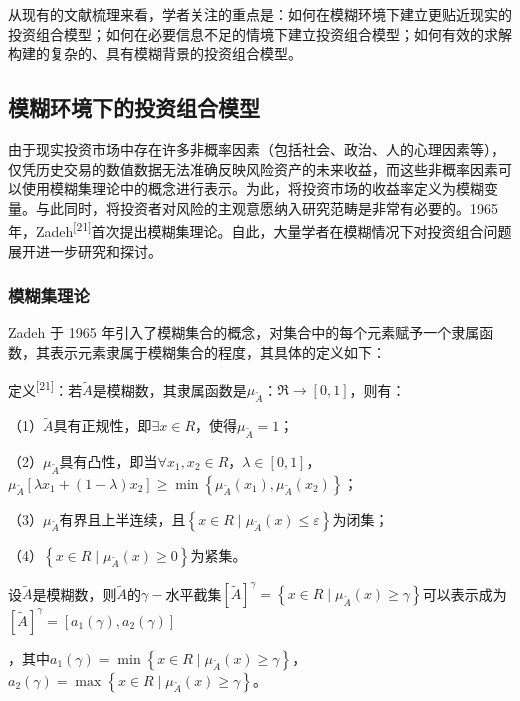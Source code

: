 \documentclass[]{article}
\begin{document}
从现有的文献梳理来看，学者关注的重点是：如何在模糊环境下建立更贴近现实的投资组合模型；如何在必要信息不足的情境下建立投资组合模型；如何有效的求解构建的复杂的、具有模糊背景的投资组合模型。

\hypertarget{header-n12}{%
\subsection{模糊环境下的投资组合模型}\label{header-n12}}

由于现实投资市场中存在许多非概率因素（包括社会、政治、人的心理因素等），仅凭历史交易的数值数据无法准确反映风险资产的未来收益，而这些非概率因素可以使用模糊集理论中的概念进行表示。为此，将投资市场的收益率定义为模糊变量。与此同时，将投资者对风险的主观意愿纳入研究范畴是非常有必要的。1965
年，Zadeh\textsuperscript{{[}21{]}}首次提出模糊集理论。自此，大量学者在模糊情况下对投资组合问题展开进一步研究和探讨。

\hypertarget{header-n14}{%
\subsubsection{模糊集理论}\label{header-n14}}

Zadeh 于 1965
年引入了模糊集合的概念，对集合中的每个元素赋予一个隶属函数，其表示元素隶属于模糊集合的程度，其具体的定义如下：

定义\textsuperscript{{[}21{]}}：若\(\widetilde{A}\)是模糊数，其隶属函数是\(\mu_{\widetilde{A}}\)：\(\Re \rightarrow[0,1]\)，则有：

（1）\(\widetilde{A}\)具有正规性，即\(\exists x \in R\)，使得\(\mu_{\widetilde{A}}=1\)；

（2）\(\mu_{\widetilde{A}}\)具有凸性，即当\(\forall x_{1}, x_{2} \in R\)，\(\lambda \in [0,1]\)，\(\mu_{\tilde{A}}\left[\lambda x_{1}+(1-\lambda) x_{2}\right] \geq \min \left\{\mu_{\tilde{A}}\left(x_{1}\right), \mu_{\widetilde{A}}\left(x_{2}\right)\right\}\)；

（3）\(\mu_{\widetilde{A}}\)有界且上半连续，且\(\left\{x \in R \mid \mu_{\widetilde{A}}(x) \leq \varepsilon\right\}\)为闭集；

（4）\(\left\{x \in R \mid \mu_{\widetilde{A}}(x) \geq 0\right\}\)为紧集。

设\(\widetilde{A}\)是模糊数，则\(\widetilde{A}\)的\(\gamma-\)水平截集\([\tilde{A}]^{\gamma}=\left\{x \in R \mid \mu_{\tilde{A}}(x) \geq \gamma\right\}\)可以表示成为\([\widetilde{A}]^{\gamma}=\left[a_{1}(\gamma), a_{2}(\gamma)\right]\)

，其中\(a_{1}(\gamma)=\min \left\{x \in R \mid \mu_{\tilde{A}}(x) \geq \gamma\right\}\)，\(a_{2}(\gamma)=\max \left\{x \in R \mid \mu_{\tilde{A}}(x) \geq \gamma\right\}\)。
\end{document}
